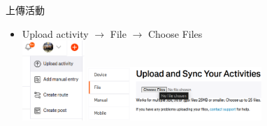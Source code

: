 \begin{frame}{上傳活動}
\begin{itemize}
\item Upload activity $\to$ File $\to$ Choose Files\\
\includegraphics[height=3cm]{uploadActivity.png}
\includegraphics[height=2cm]{uploadActivity2.png}
\end{itemize}
\end{frame}
